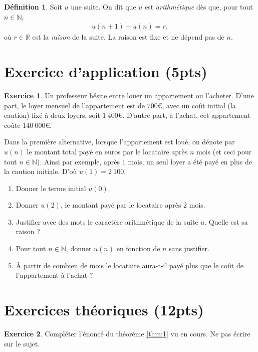 \documentclass[12pt]{paper}
\theoremstyle{plain}
\theoremstyle{definition}
\newtheorem{ex}{Exercice}
\newtheorem{definition}{Définition}
\newcommand{\R}{\mathbb{R}}
\newcommand{\N}{\mathbb{N}}
\begin{document}
\pagestyle{fancy}
\fancyhead[R]{\today}

\begin{definition}\label{def:1}
	Soit $u$ une suite. On dit que $u$ est \emph{arithmétique} dès que, pour tout $n\in\N$,
		\begin{align}\label{eq:def}
			u(n+1) - u(n) = r,
		\end{align}
	où $r\in\R$ est la \emph{raison} de la suite. La raison est fixe et ne dépend pas de $n$.
\end{definition}
	

\section*{Exercice d'application (5pts)}

\begin{ex}
	Un professeur hésite entre louer un appartement ou l'acheter.
	D'une part, le loyer mensuel de l'appartement est de $700$€, avec un coût initial (la caution) fixé à deux loyers, soit $1\ 400$€.
	D'autre part, à l'achat, cet appartement coûte $140 \ 000$€.
	
	Dans la première alternative, lorsque l'appartement est loué, on dénote par $u(n)$ le montant total payé en euros par le locataire après $n$ mois (et ceci pour tout $n\in\N$).
	Ainsi par exemple, après $1$ mois, un seul loyer a été payé en plus de la caution initiale. D'où $u(1) = 2 \ 100$.
	\begin{enumerate}
		\item Donner le terme initial $u(0)$.
		\item Donner $u(2)$, le montant payé par le locataire après $2$ mois.
		\item Justifier avec des mots le caractère arithmétique de la suite $u$. Quelle est sa raison ?
		\item Pour tout $n\in\N$, donner $u(n)$ en fonction de $n$ sans justifier.
		\item À partir de combien de mois le locataire aura-t-il payé plus que le coût de l'appartement à l'achat ?
	\end{enumerate}
\end{ex}

\section*{Exercices théoriques (12pts)}

\begin{ex}
	Compléter l'énoncé du théorème \ref{thm:1} vu en cours. Ne pas écrire sur le sujet.
\end{ex}
\end{document}
